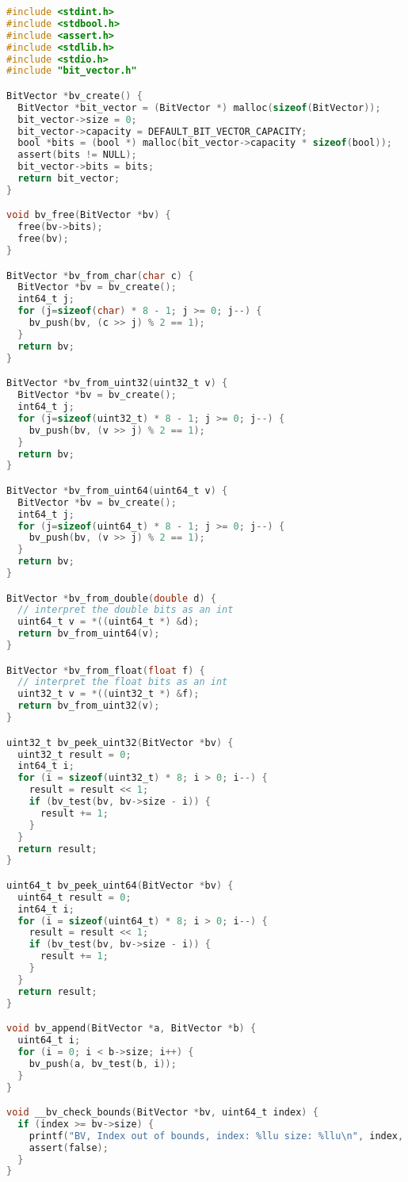 \documentclass[fancychapters]{report}   	%
\begin{document}
\begin{lstlisting}[language=C,caption={bit_vector.c}]
#include <stdint.h>
#include <stdbool.h>
#include <assert.h>
#include <stdlib.h>
#include <stdio.h>
#include "bit_vector.h"

BitVector *bv_create() {
  BitVector *bit_vector = (BitVector *) malloc(sizeof(BitVector));
  bit_vector->size = 0;
  bit_vector->capacity = DEFAULT_BIT_VECTOR_CAPACITY;
  bool *bits = (bool *) malloc(bit_vector->capacity * sizeof(bool));
  assert(bits != NULL);
  bit_vector->bits = bits;
  return bit_vector;
}

void bv_free(BitVector *bv) {
  free(bv->bits);
  free(bv);
}

BitVector *bv_from_char(char c) {
  BitVector *bv = bv_create();
  int64_t j;
  for (j=sizeof(char) * 8 - 1; j >= 0; j--) {
    bv_push(bv, (c >> j) % 2 == 1);
  }
  return bv;
}

BitVector *bv_from_uint32(uint32_t v) {
  BitVector *bv = bv_create();
  int64_t j;
  for (j=sizeof(uint32_t) * 8 - 1; j >= 0; j--) {
    bv_push(bv, (v >> j) % 2 == 1);
  }
  return bv;
}

BitVector *bv_from_uint64(uint64_t v) {
  BitVector *bv = bv_create();
  int64_t j;
  for (j=sizeof(uint64_t) * 8 - 1; j >= 0; j--) {
    bv_push(bv, (v >> j) % 2 == 1);
  }
  return bv;
}

BitVector *bv_from_double(double d) {
  // interpret the double bits as an int
  uint64_t v = *((uint64_t *) &d);
  return bv_from_uint64(v);
}

BitVector *bv_from_float(float f) {
  // interpret the float bits as an int
  uint32_t v = *((uint32_t *) &f);
  return bv_from_uint32(v);
}

uint32_t bv_peek_uint32(BitVector *bv) {
  uint32_t result = 0;
  int64_t i;
  for (i = sizeof(uint32_t) * 8; i > 0; i--) {
    result = result << 1;
    if (bv_test(bv, bv->size - i)) {
      result += 1;
    }
  }
  return result;
}

uint64_t bv_peek_uint64(BitVector *bv) {
  uint64_t result = 0;
  int64_t i;
  for (i = sizeof(uint64_t) * 8; i > 0; i--) {
    result = result << 1;
    if (bv_test(bv, bv->size - i)) {
      result += 1;
    }
  }
  return result;
}

void bv_append(BitVector *a, BitVector *b) {
  uint64_t i;
  for (i = 0; i < b->size; i++) {
    bv_push(a, bv_test(b, i));
  }
}

void __bv_check_bounds(BitVector *bv, uint64_t index) {
  if (index >= bv->size) {
    printf("BV, Index out of bounds, index: %llu size: %llu\n", index, bv->size);
    assert(false);
  }
}


\end{lstlisting}
\end{document}

